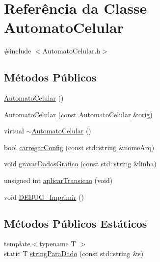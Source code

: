 \hypertarget{class_automato_celular}{
\section{Referência da Classe AutomatoCelular}
\label{class_automato_celular}
}


{\ttfamily \#include $<$AutomatoCelular.h$>$}

\subsection*{Métodos Públicos}
\begin{DoxyCompactItemize}
\item 
\hyperlink{class_automato_celular_a0e64c500f3d095f6d8459881bd8c41b0}{AutomatoCelular} ()
\item 
\hyperlink{class_automato_celular_aa12083ce74313246e1a30a86da778ba2}{AutomatoCelular} (const \hyperlink{class_automato_celular}{AutomatoCelular} \&orig)
\item 
virtual \hyperlink{class_automato_celular_ae4b6ccb5a2c619810be8cb6a5f1e9de7}{$\sim$AutomatoCelular} ()
\item 
bool \hyperlink{class_automato_celular_a80328e485a49d7c42e0de21569679a35}{carregarConfig} (const std::string \&nomeArq)
\item 
void \hyperlink{class_automato_celular_a285e7642933beb02843c582de0d1b212}{gravarDadosGrafico} (const std::string \&linha)
\item 
unsigned int \hyperlink{class_automato_celular_a4ceba72739c23aff55e06337c467f60b}{aplicarTransicao} (void)
\item 
void \hyperlink{class_automato_celular_a0cc051d4a42328a8f370ff9d473a1566}{DEBUG\_\-Imprimir} ()
\end{DoxyCompactItemize}
\subsection*{Métodos Públicos Estáticos}
\begin{DoxyCompactItemize}
\item 
{\footnotesize template$<$typename T $>$ }\\static T \hyperlink{class_automato_celular_a3dff33297f297c16a6842601aaf78d54}{stringParaDado} (const std::string \&s)
\end{DoxyCompactItemize}


